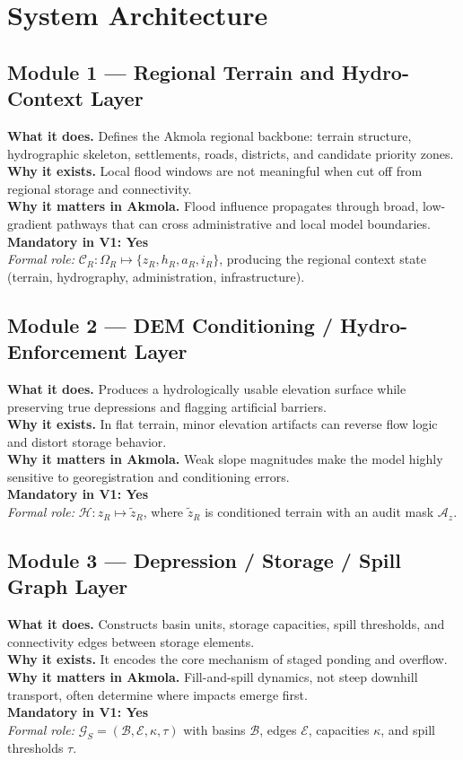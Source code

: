 \documentclass[11pt,a4paper]{article}
\newcommand{\modulerole}[1]{\textit{Formal role:} #1}
\newcommand{\vone}{\textbf{Mandatory in V1: Yes}}
\begin{document}
\section{System Architecture}

\subsection{Module 1 --- Regional Terrain and Hydro-Context Layer}
\textbf{What it does.} Defines the Akmola regional backbone: terrain structure, hydrographic skeleton, settlements, roads, districts, and candidate priority zones.\\
\textbf{Why it exists.} Local flood windows are not meaningful when cut off from regional storage and connectivity.\\
\textbf{Why it matters in Akmola.} Flood influence propagates through broad, low-gradient pathways that can cross administrative and local model boundaries.\\
\vone\\
\modulerole{$\mathcal{C}_R:\Omega_R \mapsto \{z_R,h_R,a_R,i_R\}$, producing the regional context state (terrain, hydrography, administration, infrastructure).}

\subsection{Module 2 --- DEM Conditioning / Hydro-Enforcement Layer}
\textbf{What it does.} Produces a hydrologically usable elevation surface while preserving true depressions and flagging artificial barriers.\\
\textbf{Why it exists.} In flat terrain, minor elevation artifacts can reverse flow logic and distort storage behavior.\\
\textbf{Why it matters in Akmola.} Weak slope magnitudes make the model highly sensitive to georegistration and conditioning errors.\\
\vone\\
\modulerole{$\mathcal{H}: z_R \mapsto \tilde{z}_R$, where $\tilde{z}_R$ is conditioned terrain with an audit mask $\mathcal{A}_z$.}

\subsection{Module 3 --- Depression / Storage / Spill Graph Layer}
\textbf{What it does.} Constructs basin units, storage capacities, spill thresholds, and connectivity edges between storage elements.\\
\textbf{Why it exists.} It encodes the core mechanism of staged ponding and overflow.\\
\textbf{Why it matters in Akmola.} Fill-and-spill dynamics, not steep downhill transport, often determine where impacts emerge first.\\
\vone\\
\modulerole{$\mathcal{G}_S=(\mathcal{B},\mathcal{E},\kappa,\tau)$ with basins $\mathcal{B}$, edges $\mathcal{E}$, capacities $\kappa$, and spill thresholds $\tau$.}
\end{document}
